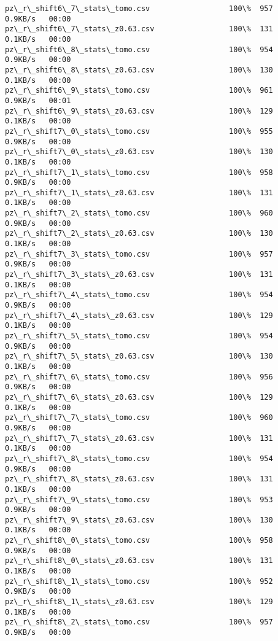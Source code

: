 \documentclass[11pt]{article}
\begin{document}
\begin{Verbatim}[commandchars=\\\{\}]
pz\_r\_shift6\_7\_stats\_tomo.csv                  100\%  957     0.9KB/s   00:00    
pz\_r\_shift6\_7\_stats\_z0.63.csv                 100\%  131     0.1KB/s   00:00    
pz\_r\_shift6\_8\_stats\_tomo.csv                  100\%  954     0.9KB/s   00:00    
pz\_r\_shift6\_8\_stats\_z0.63.csv                 100\%  130     0.1KB/s   00:00    
pz\_r\_shift6\_9\_stats\_tomo.csv                  100\%  961     0.9KB/s   00:01    
pz\_r\_shift6\_9\_stats\_z0.63.csv                 100\%  129     0.1KB/s   00:00    
pz\_r\_shift7\_0\_stats\_tomo.csv                  100\%  955     0.9KB/s   00:00    
pz\_r\_shift7\_0\_stats\_z0.63.csv                 100\%  130     0.1KB/s   00:00    
pz\_r\_shift7\_1\_stats\_tomo.csv                  100\%  958     0.9KB/s   00:00    
pz\_r\_shift7\_1\_stats\_z0.63.csv                 100\%  131     0.1KB/s   00:00    
pz\_r\_shift7\_2\_stats\_tomo.csv                  100\%  960     0.9KB/s   00:00    
pz\_r\_shift7\_2\_stats\_z0.63.csv                 100\%  130     0.1KB/s   00:00    
pz\_r\_shift7\_3\_stats\_tomo.csv                  100\%  957     0.9KB/s   00:00    
pz\_r\_shift7\_3\_stats\_z0.63.csv                 100\%  131     0.1KB/s   00:00    
pz\_r\_shift7\_4\_stats\_tomo.csv                  100\%  954     0.9KB/s   00:00    
pz\_r\_shift7\_4\_stats\_z0.63.csv                 100\%  129     0.1KB/s   00:00    
pz\_r\_shift7\_5\_stats\_tomo.csv                  100\%  954     0.9KB/s   00:00    
pz\_r\_shift7\_5\_stats\_z0.63.csv                 100\%  130     0.1KB/s   00:00    
pz\_r\_shift7\_6\_stats\_tomo.csv                  100\%  956     0.9KB/s   00:00    
pz\_r\_shift7\_6\_stats\_z0.63.csv                 100\%  129     0.1KB/s   00:00    
pz\_r\_shift7\_7\_stats\_tomo.csv                  100\%  960     0.9KB/s   00:00    
pz\_r\_shift7\_7\_stats\_z0.63.csv                 100\%  131     0.1KB/s   00:00    
pz\_r\_shift7\_8\_stats\_tomo.csv                  100\%  954     0.9KB/s   00:00    
pz\_r\_shift7\_8\_stats\_z0.63.csv                 100\%  131     0.1KB/s   00:00    
pz\_r\_shift7\_9\_stats\_tomo.csv                  100\%  953     0.9KB/s   00:00    
pz\_r\_shift7\_9\_stats\_z0.63.csv                 100\%  130     0.1KB/s   00:00    
pz\_r\_shift8\_0\_stats\_tomo.csv                  100\%  958     0.9KB/s   00:00    
pz\_r\_shift8\_0\_stats\_z0.63.csv                 100\%  131     0.1KB/s   00:00    
pz\_r\_shift8\_1\_stats\_tomo.csv                  100\%  952     0.9KB/s   00:00    
pz\_r\_shift8\_1\_stats\_z0.63.csv                 100\%  129     0.1KB/s   00:00    
pz\_r\_shift8\_2\_stats\_tomo.csv                  100\%  957     0.9KB/s   00:00    

\end{Verbatim}
\end{document}
